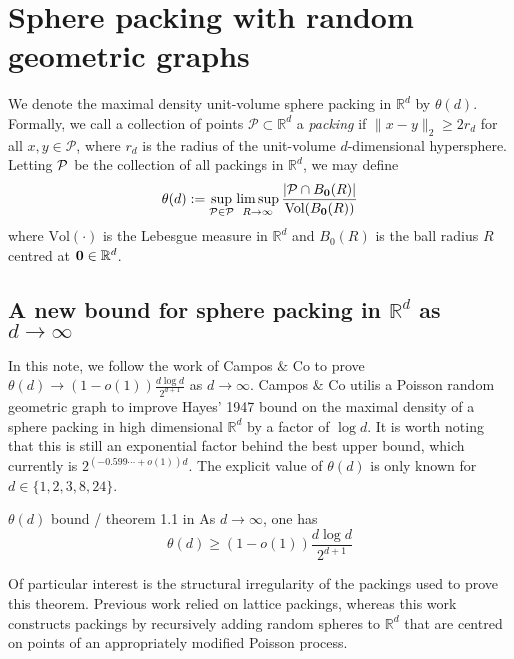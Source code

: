 \documentclass{article}
\newcounter{definitioncount} %
\newcounter{lemmacount}
\newcounter{examplecount}
\newcounter{theoremcount}
\newcounter{propositioncount}
\newcounter{corollarycount}
\newcounter{remarkcount}
\begin{document}
\newpage

\section{Sphere packing with random geometric graphs}

\setcounter{lemmacount}{1}
\setcounter{examplecount}{1}
\setcounter{theoremcount}{1}
\setcounter{propositioncount}{1}
\setcounter{corollarycount}{1}
\setcounter{remarkcount}{1}
\setcounter{definitioncount}{1}

We denote the maximal density unit-volume sphere packing in $\mathbb{R}^d$ by $\theta(d)$. Formally, we call 
a collection of points $\mathcal{P} \subset \mathbb{R}^d$ a {\it packing} if $\lVert x - y \rVert_2 \geq 2r_d$ for 
all $x,y \in \mathcal{P}$, where $r_d$ is the radius of the unit-volume $d$-dimensional hypersphere. Letting 
${\bf \mathcal{P}}$ be the collection of all packings in $\mathbb{R}^d$, we may define 
\[\theta(d) := \sup_{\mathcal{P} \in {\bf \mathcal{P}}} \limsup_{R \to \infty}
\frac{|\mathcal{P} \cap B_{{\bf 0}}(R)|}{\text{Vol}(B_{{\bf 0}}(R))}\]
where $\text{Vol}(\cdot)$ is the Lebesgue measure in $\mathbb{R}^d$ and $B_0(R)$ is the ball radius $R$ centred at 
${\bf 0} \in \mathbb{R}^d$. 

\subsection{A new bound for sphere packing in $\mathbb{R}^d$ as $d \to \infty$}

In this note, we follow the work of Campos $\&$ Co to prove $\theta(d) \to (1 - o(1))\frac{d\log d}{2^{d+1}}$ as 
$d \to \infty$. Campos $\&$ Co utilis a Poisson random geometric graph to improve Hayes' 1947 bound on the maximal density 
of a sphere packing in high dimensional $\mathbb{R}^d$ by a factor of $\log d$. It is worth noting that this is still 
an exponential factor behind the best upper bound, which currently is $2^{(-0.599\cdots + o(1))d}$. The explicit 
value of $\theta(d)$ is only known for $d \in \{1,2,3,8,24\}$. 

\begin{theorem}[]{$\theta(d)$ bound / theorem 1.1 in \cite{campos2023}}
    As $d \to \infty$, one has \[\theta(d) \geq (1 - o(1))\frac{d\log d}{2^{d+1}}\] 
\end{theorem}

Of particular interest is the structural irregularity of the packings used to prove this theorem. Previous work 
relied on lattice packings, whereas this work constructs packings by recursively adding random spheres to $\mathbb{R}^d$
that are centred on points of an appropriately modified Poisson process. \\
\end{document}
